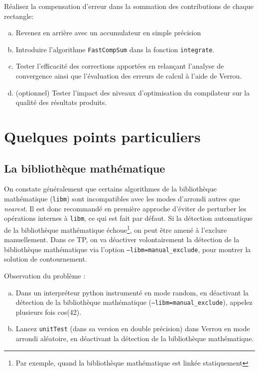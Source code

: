 \documentclass[a4paper]{article}
\newcounter{Question}
\newenvironment{question}[1][\unskip]{
  \bigskip
  \stepcounter{Question}
  \def\questionTitle{ #1}
  \begin{mdframed}[style=question]
  }{
  \end{mdframed}
}
\begin{document}
\begin{question}
  Réalisez la compensation d'erreur dans la sommation des contributions de
  chaque rectangle:
  \begin{enumerate}[(a)]
  \item Revenez en arrière avec un accumulateur en simple précision
  \item Introduire l'algorithme \texttt{FastCompSum} dans la fonction
    \texttt{integrate}.
  \item Tester l'efficacité des corrections apportées en relançant l'analyse de
    convergence ainsi que l'évaluation des erreurs de calcul à l'aide de Verrou.
  \item (optionnel) Tester l'impact des niveaux d'optimisation du compilateur
    sur la qualité des résultats produits.
  \end{enumerate}
\end{question}



\section{Quelques points particuliers}

\subsection{La bibliothèque mathématique}
\label{ref:libm}

On constate généralement que certains algorithmes de la bibliothèque
mathématique (\texttt{libm}) sont incompatibles avec les modes d'arrondi autres
que \textit{nearest}. Il est donc recommandé en première approche d'éviter
de perturber les opérations internes à \texttt{libm}, ce qui est fait par défaut.
Si la détection automatique de la bibliothèque mathématique
échoue\footnote{Par exemple, quand la bibliothèque mathématique est
linkée statiquement}, on peut être amené à l'exclure 
manuellement. Dans ce TP, on va déactiver volontairement la détection
de la bibliothèque mathématique via l'option
\texttt{--libm=manual\_exclude}, pour montrer la solution de contournement.


\begin{question}
  Observation du problème :
  \begin{enumerate}[(a)]
  \item Dans un interpréteur python instrumenté en mode random, en déactivant la détection de la bibliothèque mathématique (\texttt{--libm=manual\_exclude}), appelez plusieurs fois cos(42).
  \item Lancez \texttt{unitTest} (dans sa version en double précision) dans Verrou en mode arrondi aléatoire,  en déactivant la détection de la bibliothèque mathématique.
  \end{enumerate}
\end{question}
\end{document}
